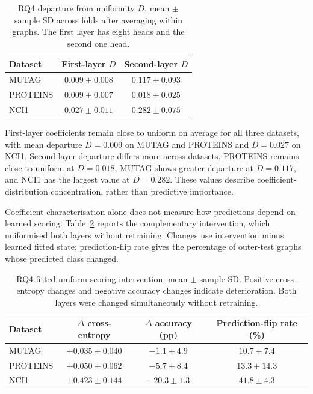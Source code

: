 \documentclass[11pt,a4paper]{article}
\begin{document}
\begin{table}[!ht]
\centering
\caption{RQ4 departure from uniformity \(D\), mean \(\pm\) sample SD across folds after averaging within graphs. The first layer has eight heads and the second one head.}
\label{tab:rq4-departure}
\begin{tabular}{@{}lcc@{}}
\toprule
Dataset & First-layer \(D\) & Second-layer \(D\)\\
\midrule
MUTAG & \(0.009\pm0.008\) & \(0.117\pm0.093\)\\
PROTEINS & \(0.009\pm0.007\) & \(0.018\pm0.025\)\\
NCI1 & \(0.027\pm0.011\) & \(0.282\pm0.075\)\\
\bottomrule
\end{tabular}
\end{table}

First-layer coefficients remain close to uniform on average for all three datasets, with mean departure \(D=0.009\) on MUTAG and PROTEINS and \(D=0.027\) on NCI1. Second-layer departure differs more across datasets. PROTEINS remains close to uniform at \(D=0.018\), MUTAG shows greater departure at \(D=0.117\), and NCI1 has the largest value at \(D=0.282\). These values describe coefficient-distribution concentration, rather than predictive importance.

Coefficient characterisation alone does not measure how predictions depend on learned scoring. Table~\ref{tab:rq4-intervention} reports the complementary intervention, which uniformised both layers without retraining. Changes use intervention minus learned fitted state; prediction-flip rate gives the percentage of outer-test graphs whose predicted class changed.

\begin{table}[!ht]
\centering
\caption{RQ4 fitted uniform-scoring intervention, mean \(\pm\) sample SD. Positive cross-entropy changes and negative accuracy changes indicate deterioration. Both layers were changed simultaneously without retraining.}
\label{tab:rq4-intervention}
\begin{tabular}{@{}lccc@{}}
\toprule
Dataset & \(\Delta\) cross-entropy & \(\Delta\) accuracy (pp) & Prediction-flip rate (\%)\\
\midrule
MUTAG & \(+0.035\pm0.040\) & \(-1.1\pm4.9\) & \(10.7\pm7.4\)\\
PROTEINS & \(+0.050\pm0.062\) & \(-5.7\pm8.4\) & \(13.3\pm14.3\)\\
NCI1 & \(+0.423\pm0.144\) & \(-20.3\pm1.3\) & \(41.8\pm4.3\)\\
\bottomrule
\end{tabular}
\end{table}
\end{document}
